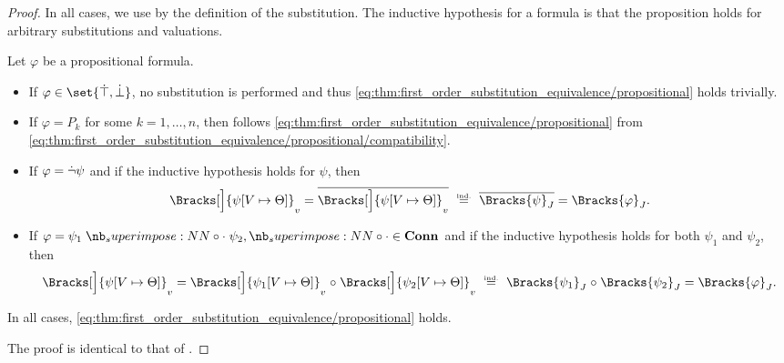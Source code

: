 \begin{proof}
  In all cases, we use  by the definition of the substitution. The inductive hypothesis for a formula is that the proposition holds for arbitrary substitutions and valuations.

   Let \( \varphi \) be a propositional formula.
  \begin{itemize}
    \item If \( \varphi \in \set{ \syntop, \synbot } \), no substitution is performed and thus \eqref{eq:thm:first_order_substitution_equivalence/propositional} holds trivially.

    \item If \( \varphi = P_k \) for some \( k = 1, \ldots, n \), then follows \eqref{eq:thm:first_order_substitution_equivalence/propositional} from \eqref{eq:thm:first_order_substitution_equivalence/propositional/compatibility}.

    \item If \( \varphi = \dot{\neg} \psi \) and if the inductive hypothesis holds for \( \psi \), then
    \begin{equation*}
      \Bracks[\Big]{ \psi[V \mapsto \Theta] }_v
      =
      \oline{\Bracks[\Big]{ \psi[V \mapsto \Theta] }_v}
      \reloset {\T{ind.}} =
      \oline{\Bracks{\psi}_J}
      =
      \Bracks{\varphi}_J.
    \end{equation*}

    \item If \( \varphi = \psi_1 \syncirc \psi_2, {\syncirc} \in \op*{Conn} \) and if the inductive hypothesis holds for both \( \psi_1 \) and \( \psi_2 \), then
    \begin{equation*}
      \Bracks[\Big]{ \psi[V \mapsto \Theta] }_v
      =
      \Bracks[\Big]{ \psi_1[V \mapsto \Theta] }_v \relcirc \Bracks[\Big]{ \psi_2[V \mapsto \Theta] }_v
      \reloset {\T{ind.}} =
      \Bracks{\psi_1}_J \relcirc \Bracks{\psi_2}_J
      =
      \Bracks{\varphi}_J.
    \end{equation*}
  \end{itemize}

  In all cases, \eqref{eq:thm:first_order_substitution_equivalence/propositional} holds.

   The proof is identical to that of .


\end{proof}
